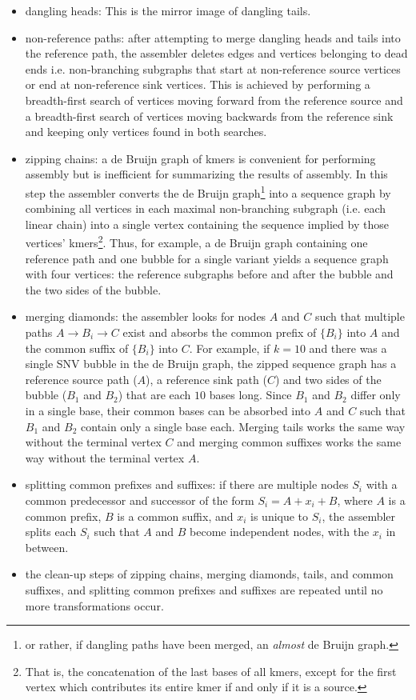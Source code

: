 \documentclass[nofootinbib,amssymb,amsmath]{revtex4}
\begin{document}
\begin{itemize}
\item dangling heads: This is the mirror image of dangling tails.

\item non-reference paths: after attempting to merge dangling heads and tails into the reference path, the assembler deletes edges and vertices belonging to dead ends i.e. non-branching subgraphs that start at non-reference source vertices or end at non-reference sink vertices.  This is achieved by performing a breadth-first search of vertices moving forward from the reference source and a breadth-first search of vertices moving backwards from the reference sink and keeping only vertices found in both searches.

\item zipping chains: a de Bruijn graph of kmers is convenient for performing assembly but is inefficient for summarizing the results of assembly.  In this step the assembler converts the de Bruijn graph\footnote{or rather, if dangling paths have been merged, an \textit{almost} de Bruijn graph.} into a sequence graph by combining all vertices in each maximal non-branching subgraph (i.e. each linear chain) into a single vertex containing the sequence implied by those vertices' kmers\footnote{That is, the concatenation of the last bases of all kmers, except for the first vertex which contributes its entire kmer if and only if it is a source.}.  Thus, for example, a de Bruijn graph containing one reference path and one bubble for a single variant yields a sequence graph with four vertices: the reference subgraphs before and after the bubble and the two sides of the bubble.

\item merging diamonds: the assembler looks for nodes $A$ and $C$ such that multiple paths $A \rightarrow B_i \rightarrow C$ exist and absorbs the common prefix of $\{B_i\}$ into $A$ and the common suffix of $\{ B_i \}$ into $C$.  For example, if $k = 10$ and there was a single SNV bubble in the de Bruijn graph, the zipped sequence graph has a reference source path  ($A$), a reference sink path ($C$) and two sides of the bubble ($B_1$ and $B_2$) that are each $10$ bases long.  Since $B_1$ and $B_2$ differ only in a single base, their common bases can be absorbed into $A$ and $C$ such that $B_1$ and $B_2$ contain only a single base each.  Merging tails works the same way without the terminal vertex $C$ and merging common suffixes works the same way without the terminal vertex $A$.

\item splitting common prefixes and suffixes: if there are multiple nodes $S_i$ with a common predecessor and successor of the form $S_i = A + x_i + B$, where $A$ is a common prefix, $B$ is a common suffix, and $x_i$ is unique to $S_i$, the assembler splits each $S_i$ such that $A$ and $B$ become independent nodes, with the $x_i$ in between.

\item the clean-up steps of zipping chains, merging diamonds, tails, and common suffixes, and splitting common prefixes and suffixes are repeated until no more transformations occur.

\end{itemize}
\end{document}
